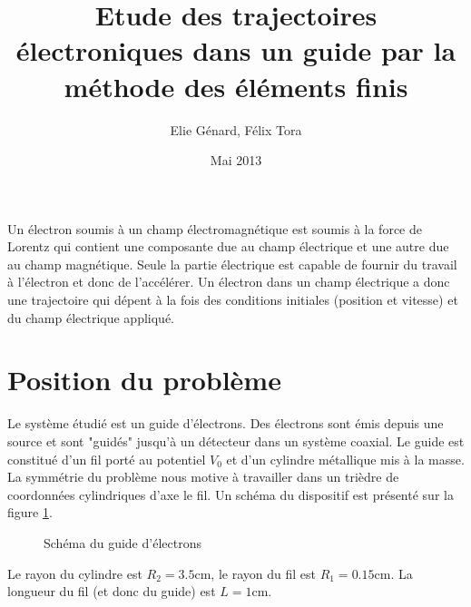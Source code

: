 \documentclass[a4paper,12pt]{article}
\title{Etude des trajectoires électroniques dans un guide par la méthode des éléments finis}
\author{Elie Génard, Félix Tora}
\date{Mai 2013}
\begin{document}
\maketitle

Un électron soumis à un champ électromagnétique est soumis à la force de Lorentz qui contient une composante due au champ électrique et une autre due au champ magnétique. Seule la partie électrique est capable de fournir du travail à l'électron et donc de l'accélérer. Un électron dans un champ électrique a donc une trajectoire qui dépent à la fois des conditions initiales (position et vitesse) et du champ électrique appliqué.

\section{Position du problème}

Le système étudié est un guide d'électrons. Des électrons sont émis depuis une source et sont "guidés" jusqu'à un détecteur dans un système coaxial. Le guide est constitué d'un fil porté au potentiel $V_0$ et d'un cylindre métallique mis à la masse. La symmétrie du problème nous motive à travailler dans un trièdre de coordonnées cylindriques d'axe le fil. Un schéma du dispositif est présenté sur la figure \ref{fig:schema}.

\begin{figure}[h]
\centering
{}
\caption{Schéma du guide d'électrons}
\label{fig:schema}
\end{figure}
Le rayon du cylindre est $R_2 = 3.5 \mathrm{cm}$, le rayon du fil est $R_1 = 0.15 \mathrm{cm}$. La longueur du fil (et donc du guide) est $L = 1 \mathrm{cm}$.
\end{document}
